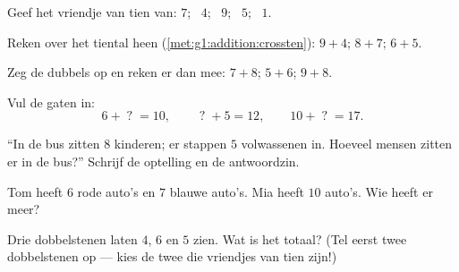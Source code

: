 \begin{exercise}[$\star$]\label{exo:g1:addition:3}
Geef het vriendje van tien van: $7$; \ $4$; \ $9$; \ $5$; \ $1$.
\end{exercise}

\begin{exercise}[$\star$]\label{exo:g1:addition:4}
Reken over het tiental heen (\cref{met:g1:addition:crossten}):
$9 + 4$; \quad $8 + 7$; \quad $6 + 5$.
\end{exercise}

\begin{exercise}[$\star$]\label{exo:g1:addition:5}
Zeg de dubbels op en reken er dan mee: $7 + 8$; \quad
$5 + 6$; \quad $9 + 8$.
\end{exercise}

\begin{exercise}[$\star$]\label{exo:g1:addition:6}
Vul de gaten in:
\[
6 + \;?\; = 10, \qquad
\;?\; + 5 = 12, \qquad
10 + \;?\; = 17 .
\]
\end{exercise}

\begin{exercise}[$\star$]\label{exo:g1:addition:7}
``In de bus zitten $8$ kinderen; er stappen $5$ volwassenen in.
Hoeveel mensen zitten er in de bus?'' Schrijf de optelling en de
antwoordzin.
\end{exercise}

\begin{exercise}[$\star$]\label{exo:g1:addition:8}
Tom heeft $6$ rode auto's en $7$ blauwe auto's. Mia heeft $10$ auto's.
Wie heeft er meer?
\end{exercise}

\begin{exercise}[$\star\star$]\label{exo:g1:addition:9}
Drie dobbelstenen laten $4$, $6$ en $5$ zien. Wat is het totaal? (Tel
eerst twee dobbelstenen op --- kies de twee die vriendjes van tien
zijn!)
\end{exercise}
